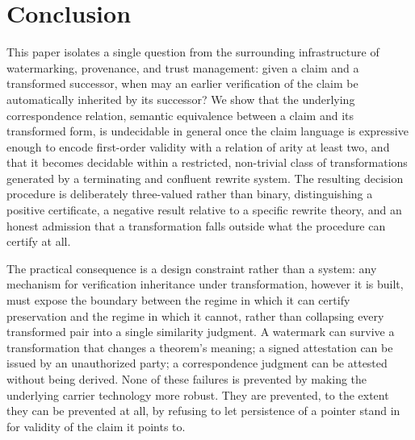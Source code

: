 \documentclass[11pt]{article}
\begin{document}
\section{Conclusion}

This paper isolates a single question from the surrounding infrastructure of watermarking, provenance, and trust management: given a claim and a transformed successor, when may an earlier verification of the claim be automatically inherited by its successor? We show that the underlying correspondence relation, semantic equivalence between a claim and its transformed form, is undecidable in general once the claim language is expressive enough to encode first-order validity with a relation of arity at least two, and that it becomes decidable within a restricted, non-trivial class of transformations generated by a terminating and confluent rewrite system. The resulting decision procedure is deliberately three-valued rather than binary, distinguishing a positive certificate, a negative result relative to a specific rewrite theory, and an honest admission that a transformation falls outside what the procedure can certify at all.

The practical consequence is a design constraint rather than a system: any mechanism for verification inheritance under transformation, however it is built, must expose the boundary between the regime in which it can certify preservation and the regime in which it cannot, rather than collapsing every transformed pair into a single similarity judgment. A watermark can survive a transformation that changes a theorem's meaning; a signed attestation can be issued by an unauthorized party; a correspondence judgment can be attested without being derived. None of these failures is prevented by making the underlying carrier technology more robust. They are prevented, to the extent they can be prevented at all, by refusing to let persistence of a pointer stand in for validity of the claim it points to.
\end{document}
